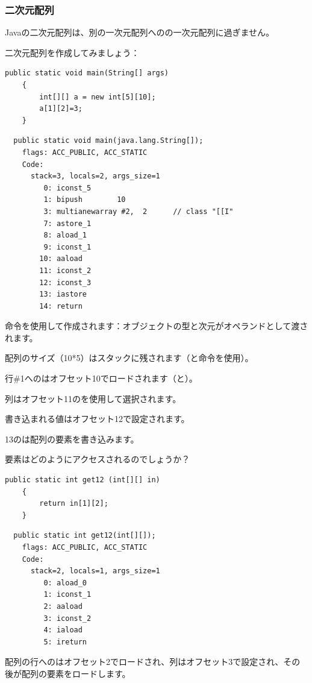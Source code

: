 \subsubsection{二次元配列}

Javaの二次元配列は、別の一次元配列へのの一次元配列に過ぎません。


二次元配列を作成してみましょう：

\begin{lstlisting}[style=customjava]
	public static void main(String[] args)
	{
		int[][] a = new int[5][10];
		a[1][2]=3;
	}
\end{lstlisting}

\begin{lstlisting}
  public static void main(java.lang.String[]);
    flags: ACC_PUBLIC, ACC_STATIC
    Code:
      stack=3, locals=2, args_size=1
         0: iconst_5      
         1: bipush        10
         3: multianewarray #2,  2      // class "[[I"
         7: astore_1      
         8: aload_1       
         9: iconst_1      
        10: aaload        
        11: iconst_2      
        12: iconst_3      
        13: iastore       
        14: return        
\end{lstlisting}

命令を使用して作成されます：オブジェクトの型と次元がオペランドとして渡されます。

配列のサイズ（10*5）はスタックに残されます（と命令を使用）。


行\#1へのはオフセット10でロードされます（と）。

列はオフセット11のを使用して選択されます。

書き込まれる値はオフセット12で設定されます。

13のは配列の要素を書き込みます。


要素はどのようにアクセスされるのでしょうか？

\begin{lstlisting}[style=customjava]
	public static int get12 (int[][] in)
	{
		return in[1][2];
	}
\end{lstlisting}

\begin{lstlisting}
  public static int get12(int[][]);
    flags: ACC_PUBLIC, ACC_STATIC
    Code:
      stack=2, locals=1, args_size=1
         0: aload_0       
         1: iconst_1      
         2: aaload        
         3: iconst_2      
         4: iaload        
         5: ireturn       
\end{lstlisting}

配列の行へのはオフセット2でロードされ、列はオフセット3で設定され、その後が配列の要素をロードします。